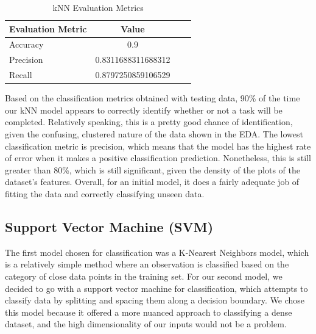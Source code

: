 \documentclass[11pt]{article}
\begin{document}
\begin{table}[hbt!]
   \large
   \centering
   \begin{tabular}{lccr}
   \hline
   \textbf{Evaluation Metric} & \textbf{Value} \\ 
   \hline
   Accuracy & 0.9  \\
   Precision & 0.8311688311688312  \\
   Recall & 0.8797250859106529  \\
   \end{tabular}
   \caption{kNN Evaluation Metrics} 
\end{table}


Based on the classification metrics obtained with testing data, 90\% of the time our kNN model appears to correctly identify whether or not a task will be completed. Relatively speaking, this is a pretty good chance of identification, given the confusing, clustered nature of the data shown in the EDA. The lowest classification metric is precision, which means that the model has the highest rate of error when it makes a positive classification prediction. Nonetheless, this is still greater than 80\%, which is still significant, given the density of the plots of the dataset's features. Overall, for an initial model, it does a fairly adequate job of fitting the data and correctly classifying unseen data.

\subsection{Support Vector Machine (SVM)}
The first model chosen for classification was a K-Nearest Neighbors model, which is a relatively simple method where an observation is classified based on the category of close data points in the training set. For our second model, we decided to go with a support vector machine for classification, which attempts to classify data by splitting and spacing them along a decision boundary. We chose this model because it offered a more nuanced approach to classifying a dense dataset, and the high dimensionality of our inputs would not be a problem.

\end{document}
